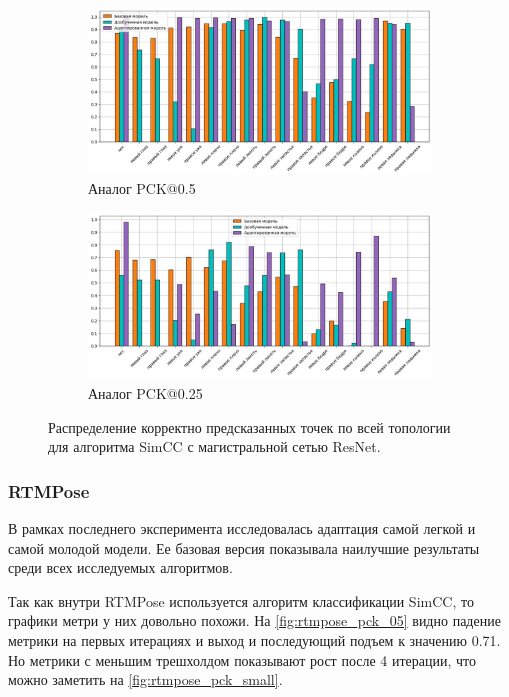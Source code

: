 \begin{figure}[H]
\centering
\begin{subfigure}{.8\textwidth}
	\centering
	\includegraphics[width=\textwidth]{./images/experiment/results/simcc/simcc_05_s}
	\caption{Аналог PCK@0.5}
	\label{fig:simcc_distr_05}
\end{subfigure}
\begin{subfigure}{.8\textwidth}
	\centering
	\includegraphics[width=\textwidth]{./images/experiment/results/simcc/simcc_025_s}
	\caption{Аналог PCK@0.25}
	\label{fig:simcc_distr_025}
\end{subfigure}
\caption{Распределение корректно предсказанных точек по всей топологии для алгоритма SimCC с магистральной сетью ResNet.}
\label{fig:simcc_distr}
\end{figure}

\subsubsection*{RTMPose}

В рамках последнего эксперимента исследовалась адаптация самой легкой и самой молодой модели. Ее базовая версия показывала наилучшие результаты среди всех исследуемых алгоритмов.

Так как внутри RTMPose используется алгоритм классификации SimCC, то графики метри у них довольно похожи. На \autoref{fig:rtmpose_pck_05} видно падение метрики на первых итерациях и выход и последующий подъем к значению 0.71. Но метрики с меньшим трешхолдом показывают рост после 4 итерации, что можно заметить на \autoref{fig:rtmpose_pck_small}.  

